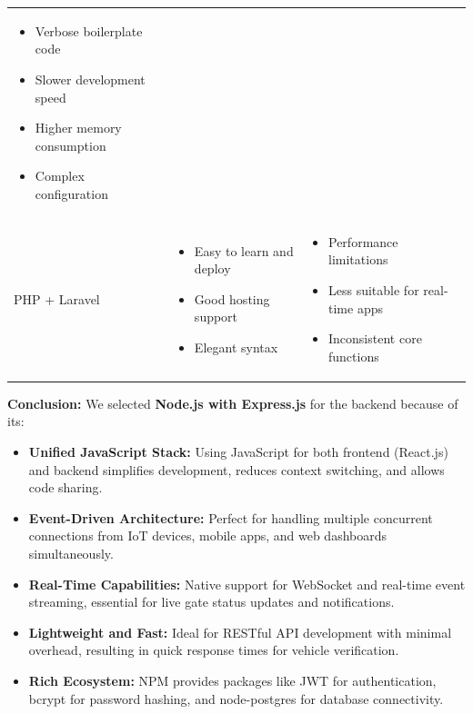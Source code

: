 \documentclass[a4paper]{article}
\begin{document}
\begin{longtable}{@{}
    >{\raggedright\arraybackslash}p{}
    >{\raggedright\arraybackslash}p{}
    >{\raggedright\arraybackslash}p{} @{}}
\begin{itemize}[leftmargin=*, nosep, topsep=0pt]
        \item Verbose boilerplate code
        \item Slower development speed
        \item Higher memory consumption
        \item Complex configuration
    \end{itemize} \\
    \addlinespace
    \midrule
    \addlinespace
    PHP + Laravel & 
    \begin{itemize}[leftmargin=*, nosep, topsep=0pt]
        \item Easy to learn and deploy
        \item Good hosting support
        \item Elegant syntax
    \end{itemize} & 
    \begin{itemize}[leftmargin=*, nosep, topsep=0pt]
        \item Performance limitations
        \item Less suitable for real-time apps
        \item Inconsistent core functions
    \end{itemize} \\
\end{longtable}

\noindent \textbf{Conclusion:} We selected \textbf{Node.js with Express.js} for the backend because of its:
\begin{itemize}[leftmargin=*, nosep, topsep=0pt]
    \item \textbf{Unified JavaScript Stack:} Using JavaScript for both frontend (React.js) and backend simplifies development, reduces context switching, and allows code sharing.
    \item \textbf{Event-Driven Architecture:} Perfect for handling multiple concurrent connections from IoT devices, mobile apps, and web dashboards simultaneously.
    \item \textbf{Real-Time Capabilities:} Native support for WebSocket and real-time event streaming, essential for live gate status updates and notifications.
    \item \textbf{Lightweight and Fast:} Ideal for RESTful API development with minimal overhead, resulting in quick response times for vehicle verification.
    \item \textbf{Rich Ecosystem:} NPM provides packages like JWT for authentication, bcrypt for password hashing, and node-postgres for database connectivity.
\end{itemize}
\end{document}
